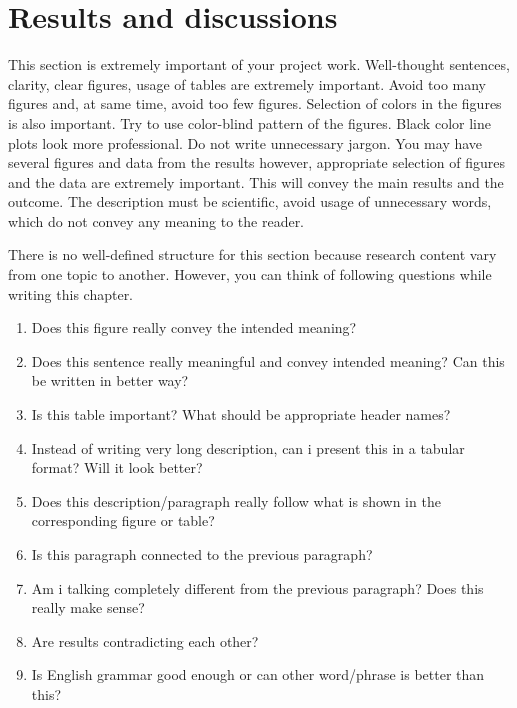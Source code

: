 \documentclass[subscriptcorrection,upint,varvw,mathalfa=cal=euler,barcolor=black,balance,hyphenate,french,pdf-a,nolists]{asmejour}
\begin{document}
\section{Results and discussions}
\label{sec:3}
This section is extremely important of your project work. Well-thought sentences, clarity, clear figures, usage of tables are extremely important. Avoid too many figures and, at same time, avoid too few figures. Selection of colors in the figures is also important. Try to use color-blind pattern of the figures. Black color line plots look more professional. Do not write unnecessary jargon. You may have several figures and data from the results however, appropriate selection of figures and the data are extremely important. This will convey the main results and the outcome. The description must be scientific, avoid usage of unnecessary words, which do not convey any meaning to the reader.

\noindent There is no well-defined structure for this section because research content vary from one topic to another. However, you can think of following questions while writing this chapter.
\begin{enumerate}
    \item Does this figure really convey the intended meaning?
    \item Does this sentence really meaningful and convey intended meaning? Can this be written in better way?
    \item Is this table important? What should be appropriate header names?
    \item Instead of writing very long description, can i present this in a tabular format? Will it look better?
    \item Does this description/paragraph really follow what is shown in the corresponding figure or table?
    \item Is this paragraph connected to the previous paragraph?
    \item Am i talking completely different from the previous paragraph? Does this really make sense?
    \item Are results contradicting each other?
    \item Is English grammar good enough or can other word/phrase is better than this?
\end{enumerate}
\end{document}
